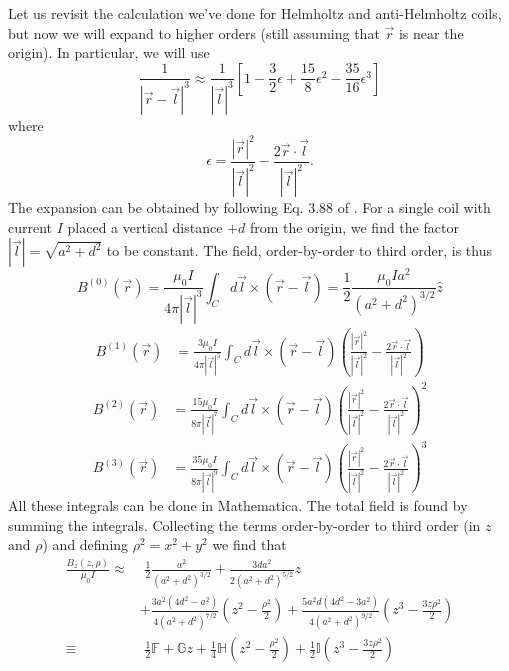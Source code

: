 \documentclass{article}
\theoremstyle{definition}
\newcommand{\f}[2]{\frac{#1}{#2}}
\newcommand{\lp}{\left(}
\newcommand{\rp}{\right)}
\newcommand{\lb}{\left[}
\newcommand{\rb}{\right]}
\begin{document}
Let us revisit the calculation we've done for Helmholtz and anti-Helmholtz coils, but now we will expand to higher orders (still assuming that $\vec{r}$ is near the origin). In particular, we will use
\begin{equation*}
\f{1}{|\vec{r} - \vec{l}|^3} \approx \f{1}{|\vec{l}|^3} 
\lb 1 -\f{3}{2}\epsilon
+ \f{15}{8}\epsilon^2 
- \f{35}{16}\epsilon^3 \rb
\end{equation*}
where
\begin{equation*}
\epsilon = \f{|\vec{r}|^2}{|\vec{l}|^2} - \f{2\vec{r}\cdot\vec{l}}{|\vec{l}|^2}.
\end{equation*}
The expansion can be obtained by following 
Eq. 3.88 of \cite{griffiths2005introduction}. For a single coil with current $I$ placed a vertical distance $+d$ from the origin, we find the factor $|\vec{l}| = \sqrt{a^2 + d^2}$ to be constant. The field, order-by-order to third order, is thus  
\begin{equation*}
B^{(0)}(\vec{r}) = \f{\mu_0 I}{4\pi |\vec{l}|^3}\int_C d\vec{l}\times (\vec{r} - \vec{l}) = \f{1}{2}\f{\mu_0 I a^2}{(a^2 + d^2)^{3/2}} \hat{z}
\end{equation*}
\begin{align*}
B^{(1)}(\vec{r}) 
&= \f{3\mu_0 I}{4\pi |\vec{l}|^5}\int_C d\vec{l}\times (\vec{r} - \vec{l}) \lp \f{|\vec{r}|^2}{|\vec{l}|^2} - \f{2\vec{r}\cdot\vec{l}}{|\vec{l}|^2} \rp
\end{align*}
\begin{align*}
B^{(2)}(\vec{r}) 
&= \f{15\mu_0 I}{8\pi |\vec{l}|^7}\int_C d\vec{l}\times (\vec{r} - \vec{l}) \lp \f{|\vec{r}|^2}{|\vec{l}|^2} - \f{2\vec{r}\cdot\vec{l}}{|\vec{l}|^2} \rp^2
\end{align*}
\begin{align*}
B^{(3)}(\vec{r}) &= \f{35\mu_0 I}{8\pi |\vec{l}|^9}\int_C d\vec{l}\times (\vec{r} - \vec{l}) \lp \f{|\vec{r}|^2}{|\vec{l}|^2} - \f{2\vec{r}\cdot\vec{l}}{|\vec{l}|^2} \rp^3
\end{align*}
All these integrals can be done in Mathematica. The total field is found by summing the integrals. Collecting the terms order-by-order to third order (in $z$ and $\rho$) and defining $\rho^2 = x^2 + y^2$ we find that
\begin{align*}
\f{B_z(z,\rho)}{\mu_0 I} \approx &\,\,\f{1}{2}\f{a^2}{(a^2+d^2)^{3/2}} + \f{3da^2}{2(a^2+d^2)^{5/2}}z 
\\
&+ \f{3a^2(4d^2 - a^2)}{4(a^2+d^2)^{7/2}} \lp z^2 - \f{\rho^2}{2} \rp
+\f{5 a^2 d (4d^2 - 3 a^2)}{4 (a^2 + d^2)^{9/2}}\lp z^3 - \f{3 z\rho^2}{2}\rp\\
\equiv&\,\, \f{1}{2}\mathbb{F} + \mathbb{G}z + \f{1}{4}\mathbb{H}\lp z^2 - \f{\rho^2}{2} \rp + \f{1}{2} \mathbb{I}\lp z^3 - \f{3 z\rho^2}{2}\rp
\end{align*}
\end{document}
